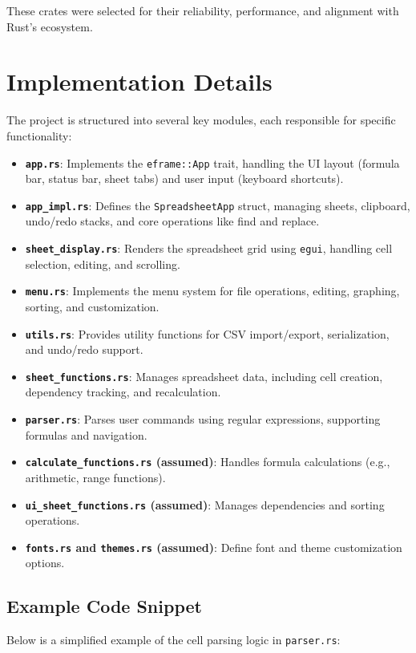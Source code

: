 \documentclass{article}
\begin{document}
These crates were selected for their reliability, performance, and alignment with Rust's ecosystem.

\section{Implementation Details}
The project is structured into several key modules, each responsible for specific functionality:

\begin{itemize}
    \item \textbf{\texttt{app.rs}}: Implements the \texttt{eframe::App} trait, handling the UI layout (formula bar, status bar, sheet tabs) and user input (keyboard shortcuts).
    \item \textbf{\texttt{app\_impl.rs}}: Defines the \texttt{SpreadsheetApp} struct, managing sheets, clipboard, undo/redo stacks, and core operations like find and replace.
    \item \textbf{\texttt{sheet\_display.rs}}: Renders the spreadsheet grid using \texttt{egui}, handling cell selection, editing, and scrolling.
    \item \textbf{\texttt{menu.rs}}: Implements the menu system for file operations, editing, graphing, sorting, and customization.
    \item \textbf{\texttt{utils.rs}}: Provides utility functions for CSV import/export, serialization, and undo/redo support.
    \item \textbf{\texttt{sheet\_functions.rs}}: Manages spreadsheet data, including cell creation, dependency tracking, and recalculation.
    \item \textbf{\texttt{parser.rs}}: Parses user commands using regular expressions, supporting formulas and navigation.
    \item \textbf{\texttt{calculate\_functions.rs} (assumed)}: Handles formula calculations (e.g., arithmetic, range functions).
    \item \textbf{\texttt{ui\_sheet\_functions.rs} (assumed)}: Manages dependencies and sorting operations.
    \item \textbf{\texttt{fonts.rs} and \texttt{themes.rs} (assumed)}: Define font and theme customization options.
\end{itemize}

\subsection{Example Code Snippet}
Below is a simplified example of the cell parsing logic in \texttt{parser.rs}:
\end{document}
